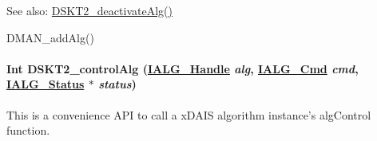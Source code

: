 \begin{Desc}
\item[See also:]\hyperlink{group___d_s_p_d_s_k_t2_g74b6b6feca63328906acade37d23b597}{DSKT2\_\-deactivate\-Alg()} 

DMAN\_\-add\-Alg() \end{Desc}
\hypertarget{group___d_s_p_d_s_k_t2_g65d8c7ae9d40adcda0c92a9e51c6fd0b}{
\paragraph[DSKT2\_\-controlAlg]{\setlength{\rightskip}{0pt plus 5cm}Int DSKT2\_\-control\-Alg (\hyperlink{struct_i_a_l_g___obj}{IALG\_\-Handle} {\em alg}, \hyperlink{group__ti__xdais___i_a_l_g_g9032f20923ef2ba1d6b88c87a20075fa}{IALG\_\-Cmd} {\em cmd}, \hyperlink{struct_i_a_l_g___status}{IALG\_\-Status} $\ast$ {\em status})}\hfill}
\label{group___d_s_p_d_s_k_t2_g65d8c7ae9d40adcda0c92a9e51c6fd0b}


This is a convenience API to call a x\-DAIS algorithm instance's alg\-Control function. 

